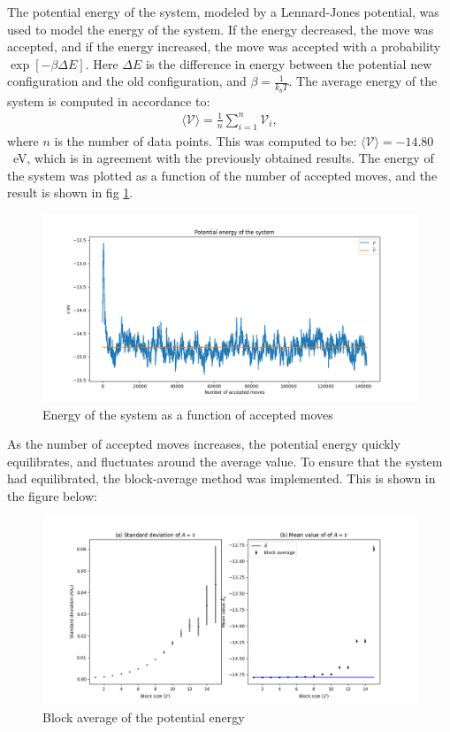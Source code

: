 \documentclass[a4paper]{article}
\newcommand{\newparagraph}{\vspace{.5cm}\noindent}
\newcommand{\average}[1]{\langle #1 \rangle}
\begin{document}
\newparagraph
The potential energy of the system, modeled by a Lennard-Jones potential, was used to model the energy of the system.
If the energy decreased, the move was accepted, and if the energy increased, the move was accepted with a probability $\exp\left[-\beta\Delta E\right]$.
Here $\Delta E$ is the difference in energy between the potential new configuration and the old configuration, and $\beta = \frac{1}{k_bT}$.
The average energy of the system is computed in accordance to:
\begin{align*}
    \average{\mathcal{V}} = \frac{1}{n}\sum_{i=1}^n \mathcal{V}_i,
\end{align*}where $n$ is the number of data points.
This was computed to be: $\average{\mathcal{V}} = -14.80$~eV, which is in agreement with the previously obtained results.
The energy of the system was plotted as a function of the number of accepted moves, and the result is shown in fig \ref{fig: energy}.
\begin{figure}[H]
    \centering
    \includegraphics[scale = 0.45]{potential_energy.png}
    \caption{Energy of the system as a function of accepted moves}
    \label{fig: energy}
\end{figure}\noindent
As the number of accepted moves increases, the potential energy quickly equilibrates, and fluctuates around the average value.
To ensure that the system had equilibrated, the block-average method was implemented.
This is shown in the figure below:
\begin{figure}[H]
    \centering
    \includegraphics[scale = 0.4]{var_p.png}
    \caption{Block average of the potential energy}
    \label{fig: block average potential}
\end{figure}\noindent
\end{document}
